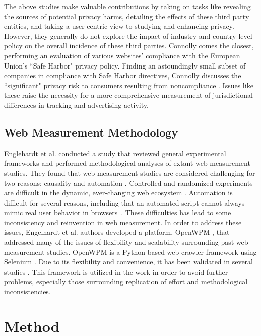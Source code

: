 \documentclass[conference]{IEEEtran}
\newcommand{\todo}[1]{}
\renewcommand{\todo}[1]{{\color{red} TODO: {#1}}}
\begin{document}
The above studies make valuable contributions by taking on tasks like revealing the sources of potential privacy harms, detailing the effects of these third party entities, and taking a user-centric view to studying and enhancing privacy. However, they generally do not explore the impact of industry and country-level policy on the overall incidence of these third parties. Connolly comes the closest, performing an evaluation of various websites' compliance with the European Union's ``Safe Harbor" privacy policy. Finding an astoundingly small subset of companies in compliance with Safe Harbor directives, Connolly discusses the ``significant" privacy risk to consumers resulting from noncompliance   \cite{connolly}. Issues like these raise the necessity for a more comprehensive measurement of jurisdictional differences in tracking and advertising activity.

\subsection{Web Measurement Methodology}
Englehardt et al. conducted a study that reviewed general experimental frameworks and performed methodological analyses of extant web measurement studies.  They found that web measurement studies are considered challenging for two reasons: causality and automation \cite{openwpm_article}.  Controlled and randomized experiments are difficult in the dynamic, ever-changing web ecosystem \cite{guha2010challenges}. Automation is difficult for several reasons, including that an automated script cannot always mimic real user behavior in browsers~\cite{openwpm_article}.  These difficulties has lead to some inconsistency and reinvention in web measurement. In order to address these issues, Engelhardt et al. authors developed a platform, OpenWPM \cite{openwpm}, that addressed many of the issues of flexibility and scalability surrounding past web measurement studies. 
OpenWPM is a Python-based web-crawler framework using Selenium \cite{Selenium}. Due to its flexibility and convenience, it has been validated in several studies \cite{openwpm}\cite{openwpm_article}. This framework is utilized in the work in order to avoid further problems, especially those surrounding replication of effort and methodological inconsistencies.

\section{Method}
\end{document}
